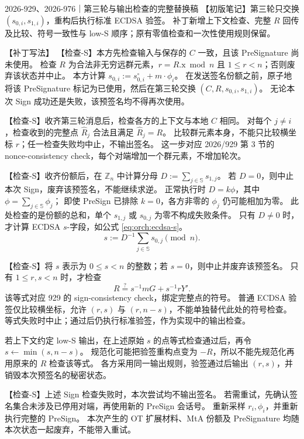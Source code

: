 \begin{patchnote}{2026-929、2026-976｜第三轮与输出检查的完整替换稿}
【初版笔记】第三轮只交换 $(s_{0,i},s_{1,i})$，重构后执行标准 ECDSA 验签。
补丁新增上下文检查、完整 $R$ 回传及比较、符号一致性与 low-S 顺序；原有零值检查和一次性使用规则保留。

【补丁写法】
【检查-S】本方先检查输入与保存的 $C$ 一致，且该 PreSignature 尚未使用。
检查 $R$ 为合法非无穷远群元素，$r=R.\mathrm{x}\bmod n$ 且 $1\le r<n$；否则废弃该状态并中止。
本方计算 $s_{0,i} := s_{0,i}^\circ + m \cdot \phi_i$。
在发送签名份额之前，原子地将该 PreSignature 标记为已使用，然后在第三轮交换 $(C,R,s_{0,i},s_{1,i})$。
无论本次 Sign 成功还是失败，该预签名均不得再次使用。

【检查-S】收齐第三轮消息后，检查各方的上下文与本地 $C$ 相同。
对每个 $j\ne i$，检查收到的完整点 $\widehat R_j$ 合法且满足 $\widehat R_j=R$。
比较群元素本身，不能只比较横坐标 $r$；任一检查失败均中止，不输出签名。
这一步对应 2026/929 第 3 节的 nonce-consistency check，每个对端增加一个群元素，不增加轮次。

【检查-S】收齐份额后，在 $\mathbb Z_n$ 中计算分母 $D := \sum_{j\in\mathbb S}s_{1,j}$。
若 $D=0$，则中止本次 Sign，废弃该预签名，不能继续求逆。
正常执行时 $D=k\phi$，其中 $\phi=\sum_{j\in\mathbb S}\phi_j$；
即使 PreSign 已排除 $k=0$，各方非零的 $\phi_j$ 仍可能相加为零。
此处检查的是份额的总和，单个 $s_{1,j}$ 或 $s_{0,j}$ 为零不构成失败条件。
只有 $D\ne0$ 时，才计算 ECDSA $s$-字段，如公式 \eqref{eq:orch:ecdsa-s}。
\begin{equation}
  \label{eq:orch:ecdsa-s}\tag{ecdsa-s}
  s := D^{-1}\sum_{j\in\mathbb S}s_{0,j} \pmod n.
\end{equation}

【检查-S】将 $s$ 表示为 $0\le s<n$ 的整数；若 $s=0$，则中止并废弃该预签名。
只有 $1\le r,s<n$ 时，才检查
\begin{equation}\label{eq:orch:sign-consistency}
R\stackrel?=s^{-1}mG+s^{-1}rY'.
\end{equation}
该等式对应 929 的 sign-consistency check，绑定完整点的符号。
普通 ECDSA 验签仅比较横坐标，允许 $(r,s)$ 与 $(r,n-s)$，不能单独替代此处的符号检查。
等式失败时中止；通过后仍执行标准验签，作为实现中的输出检查。

若上下文约定 low-S 输出，在上述原始 $s$ 的点等式检查通过后，再令 $s\gets\min(s,n-s)$。
规范化可能把验签重构点变为 $-R$，所以不能先规范化再用原来的 $R$ 检查该等式。
各方采用同一输出规则，验签通过后输出 $(r,s)$，并销毁本次预签名的秘密状态。

【检查-S】上述 Sign 检查失败时，本次尝试均不输出签名。
若需重试，先确认签名集合未涉及已停用对端，再使用新的 PreSign 会话号。
重新采样 $r_i,\phi_i$，并重新执行完整的 PreSign。
本次产生的 OT 扩展材料、MtA 份额及 PreSignature 均随本次状态一起废弃，不能带入重试。
\end{patchnote}

